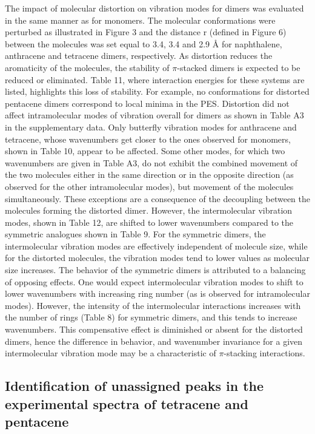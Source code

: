 The impact of molecular distortion on vibration modes for dimers was evaluated in the same manner as for monomers. The molecular conformations were perturbed as illustrated in Figure 3 and the distance r (defined in Figure 6) between the molecules was set equal to 3.4, 3.4 and 2.9 Å for naphthalene, anthracene and tetracene dimers, respectively.  As distortion reduces the aromaticity of the molecules, the stability of $\pi$-stacked dimers is expected to be reduced or eliminated. Table 11, where interaction energies for these systems are listed, highlights this loss of stability. For example, no conformations for distorted pentacene dimers correspond to local minima in the PES. Distortion did not affect intramolecular modes of vibration overall for dimers as shown in Table A3 in the supplementary data. Only butterfly vibration modes for anthracene and tetracene, whose wavenumbers get closer to the ones observed for monomers, shown in Table 10, appear to be affected. Some other modes, for which two wavenumbers are given in Table A3, do not exhibit the combined movement of the two molecules either in the same direction or in the opposite direction (as observed for the other intramolecular modes), but movement of the molecules simultaneously. These exceptions are a consequence of the decoupling between the molecules forming the distorted dimer. However, the intermolecular vibration modes, shown in Table 12, are shifted to lower wavenumbers compared to the symmetric analogues shown in Table 9. For the symmetric dimers, the intermolecular vibration modes are effectively independent of molecule size, while for the distorted molecules, the vibration modes tend to lower values as molecular size increases. 
The behavior of the symmetric dimers is attributed to a balancing of opposing effects. One would expect intermolecular vibration modes to shift to lower wavenumbers with increasing ring number (as is observed for intramolecular modes). However, the intensity of the intermolecular interactions increases with the number of rings (Table 8) for symmetric dimers, and this tends to increase wavenumbers. This compensative effect is diminished or absent for the distorted dimers, hence the difference in behavior, and wavenumber invariance for a given intermolecular vibration mode may be a characteristic of $\pi$-stacking interactions. 

\subsection{Identification of unassigned peaks in the experimental spectra of tetracene and pentacene}

